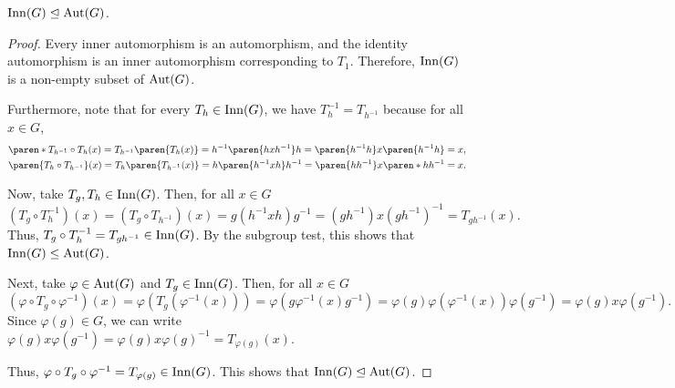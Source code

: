 \documentclass[11pt]{penrose}
\begin{document}
\begin{nthm}
    $\operatorname{Inn}(G) \mathrel{\trianglelefteq} \operatorname{Aut}(G)$.
\end{nthm}
\begin{proof}
    Every inner automorphism is an automorphism, and the identity automorphism is an inner automorphism corresponding to $T_{1}$. Therefore, $\operatorname{Inn}(G)$ is a non-empty subset of $\operatorname{Aut}(G)$.

    Furthermore, note that for every $T_{h} \in \operatorname{Inn}(G)$, we have $T_{h}^{-1} = T_{h^{-1}}$ because for all $x \in G$,
    \begin{gather*}
        \paren*{T_{h^{-1}} \circ T_{h}} (x)
        = T_{h^{-1}} \paren{ T_{h}(x) }
        = h^{-1} \paren{ h x h^{-1} } h
        = \paren{h^{-1} h} x \paren{h^{-1} h}
        = x,\\
        \paren{ T_{h} \circ T_{h^{-1}} } (x)
        = T_{h} \paren{ T_{h^{-1}}(x) }
        = h \paren{ h^{-1} x h } h^{-1}
        = \paren{h h^{-1}} x \paren*{h h^{-1}}
        = x.
    \end{gather*}

    Now, take $T_{g}, T_{h} \in \operatorname{Inn}(G)$. Then, for all $x \in G$
    \begin{equation*}
        (T_{g} \circ T_{h}^{-1}) (x)
        = (T_{g} \circ T_{h^{-1}})(x)
        = g (h^{-1} x h) g^{-1}
        = (g h^{-1}) x (g h^{-1})^{-1}
        = T_{gh^{-1}}(x).
    \end{equation*}
    Thus, $T_{g} \circ T_{h}^{-1} = T_{gh^{-1}} \in \operatorname{Inn}(G)$. By the subgroup test, this shows that $\operatorname{Inn}(G) \mathrel{\leq} \operatorname{Aut}(G)$.

    Next, take $\varphi \in \operatorname{Aut}(G)$ and $T_{g} \in \operatorname{Inn}(G)$. Then, for all $x \in G$
    \begin{equation*}
        (\varphi \circ T_{g} \circ \varphi^{-1})(x)
        = \varphi( T_{g}( \varphi^{-1}(x) ) )
        = \varphi( g \varphi^{-1}(x) g^{-1} )
        = \varphi( g ) \varphi( \varphi^{-1}(x) ) \varphi ( g^{-1} )
        = \varphi( g ) x \varphi ( g^{-1} ).
    \end{equation*}
    Since $\varphi(g) \in G$, we can write $\varphi( g ) x \varphi ( g^{-1} ) = \varphi( g ) x \varphi ( g )^{-1} = T_{\varphi(g)}(x)$.

    Thus, $\varphi \circ T_{g} \circ \varphi^{-1} = T_{\varphi(g)} \in \operatorname{Inn}(G)$. This shows that $\operatorname{Inn}(G) \mathrel{\trianglelefteq} \operatorname{Aut}(G)$.
\end{proof}
\end{document}
